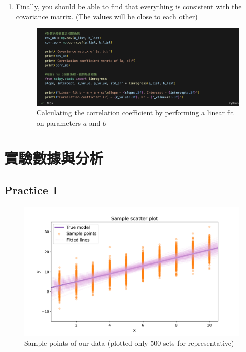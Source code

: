\documentclass[12pt,a4paper]{article}
\begin{document}
\begin{CJK}{UTF8}{bkai}
\begin{enumerate}
    \item Finally, you should be able to find that everything is consistent with the covariance matrix. (The values will be close to each other)
    \begin{figure}[h]
        \centering
        \includegraphics[width=1\linewidth]{figures/code/practice_3/code_3_4.png}
        \caption{Calculating the correlation coefficient by performing a linear fit on parameters $a$ and $b$}
        \label{fig:code_3_4}
    \end{figure}    
\end{enumerate}


\clearpage
\section{實驗數據與分析}

\subsection{Practice 1}\label{subsec:result_1}
\hfill

\begin{figure}[h]
    \centering
    \includegraphics[width=.8\linewidth]{figures/output/practice_1/output1_1.pdf}
    \caption{Sample points of our data (plotted only 500 sets for representative)}
    \label{fig:output_1_1}
\end{figure}


\end{CJK}
\end{document}
